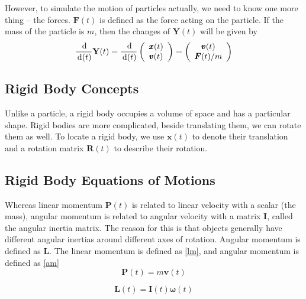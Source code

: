 However, to simulate the motion of particles actually, we need to know one more thing -- the forces. $\pmb{F}(t)$ is defined as the force acting on the particle. If the mass of the particle is $m$, then the changes of $\textbf{Y}(t)$ will be given by
\begin{equation}
    \frac{\,\mathrm{d}}{\,\mathrm{d}(t)}\textbf{Y}(t) = \frac{\,\mathrm{d}}{\,\mathrm{d}(t)}\left(
        \begin{array}{c}
            \pmb{x}(t) \\
            \pmb{v}(t) \\
        \end{array} \right) = \left(
        \begin{array}{c}
            \pmb{v}(t) \\
            \pmb{F}(t)/m \\
        \end{array} \right)
\end{equation}

\subsection{Rigid Body Concepts}
Unlike a particle, a rigid body occupies a volume of space and has a particular shape. Rigid bodies are more complicated, beside translating them, we can rotate them as well. To locate a rigid body, we use $\pmb{x}(t)$ to denote their translation and a rotation matrix $\pmb{R}(t)$ to describe their rotation.

\subsection{Rigid Body Equations of Motions}
 Whereas linear momentum $\pmb{P}(t)$ is related to linear velocity with a scalar (the mass), angular momentum is related to angular velocity with a matrix \(\pmb{I}\), called the angular inertia matrix. The reason for this is that objects generally have different angular inertias around different axes of rotation. Angular momentum is defined as \(\pmb{L}\). The linear momentum is defined as \ref{lm}, and angular momentum is defined as \ref{am}
\begin{equation}
    \pmb{P}(t) = m \pmb{v} (t)
    \label{lm}
\end{equation}

\begin{equation}
    \pmb{L}(t) = \pmb{I}(t)\pmb{\omega}(t)
    \label{am}
\end{equation}

